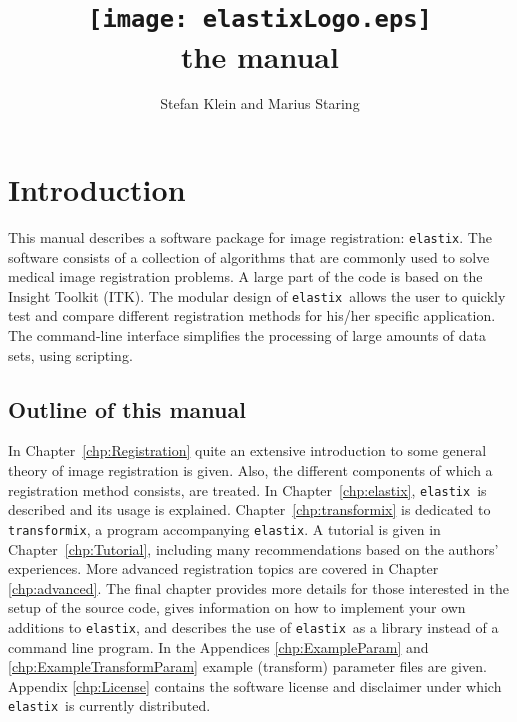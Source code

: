 \documentclass[]{report}
\newcommand{\elastix}{\texttt{elastix}}
\newcommand{\transformix}{\texttt{transformix}}
\begin{document}
\title{\texttt{[image: elastixLogo.eps]}\\\vspace{1cm}the manual\vspace{1cm}}
\author{Stefan Klein and Marius Staring}
\maketitle

\setcounter{page}{1}  \tableofcontents
\newpage
{} \setcounter{page}{1}


\chapter{Introduction}\label{chp:Introduction}

This manual describes a software package for image registration:
\elastix. The software consists of a collection of algorithms that
are commonly used to solve medical image registration problems. A
large part of the code is based on the Insight Toolkit (ITK). The
modular design of \elastix\ allows the user to quickly test and
compare different registration methods for his/her specific
application. The command-line interface simplifies the processing
of large amounts of data sets, using scripting.

\section{Outline of this manual}

In Chapter~\ref{chp:Registration} quite an extensive introduction to
some general theory of image registration is given. Also, the
different components of which a registration method consists, are
treated. In Chapter~\ref{chp:elastix}, \elastix\ is described and
its usage is explained. Chapter~\ref{chp:transformix} is dedicated
to \transformix, a program accompanying \elastix. A tutorial is
given in Chapter~\ref{chp:Tutorial}, including many recommendations
based on the authors' experiences. More advanced registration topics
are covered in Chapter \ref{chp:advanced}. The final chapter
provides more details for those interested in the setup of the
source code, gives information on how to implement your own
additions to \elastix, and describes the use of \elastix\ as a
library instead of a command line program. In the Appendices
\ref{chp:ExampleParam} and \ref{chp:ExampleTransformParam} example
(transform) parameter files are given. Appendix \ref{chp:License}
contains the software license and disclaimer under which \elastix\
is currently distributed.
\end{document}
